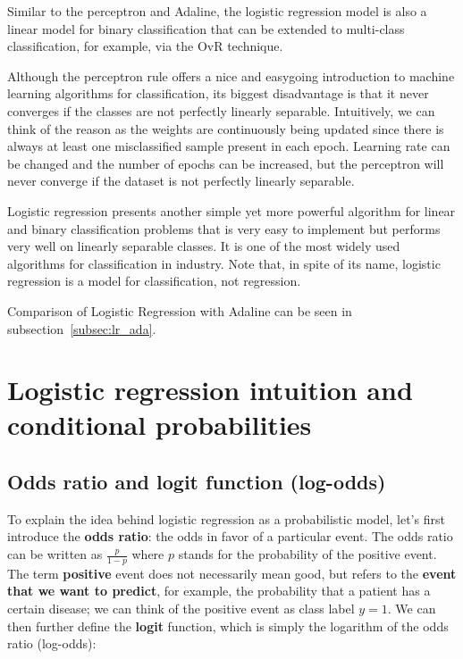 \documentclass[11pt]{article}
\begin{document}
    Similar to the perceptron\cite{Rosenblatt1957a} and Adaline\cite{Widrow1960}, the logistic regression model is also a linear model for binary classification that can be extended to multi-class classification, for example, via the OvR technique.

    Although the perceptron rule offers a nice and easygoing introduction to machine learning algorithms for classification, its biggest disadvantage is that it never converges if the classes are not perfectly linearly separable.
    Intuitively, we can think of the reason as the weights are continuously being updated since there is always at least one misclassified sample present in each epoch.
    Learning rate can be changed and the number of epochs can be increased, but the perceptron will never converge if the dataset is not perfectly linearly separable.

    Logistic regression presents another simple yet more powerful algorithm for linear and binary classification problems that is very easy to implement but performs very well on linearly separable classes.
    It is one of the most widely used algorithms for classification in industry.
    Note that, in spite of its name, logistic regression is a model for classification, not regression.

    Comparison of Logistic Regression with Adaline can be seen in subsection~\ref{subsec:lr_ada}.

    \section{Logistic regression intuition and conditional probabilities} \label{sec:lr_intu}

    \subsection{Odds ratio and logit function (log-odds)} \label{subsec:lr_log_odds}

    To explain the idea behind logistic regression as a probabilistic model, let's first introduce the \textbf{odds ratio}: the odds in favor of a particular event.
    The odds ratio can be written as $\frac{p} {1-p}$ where $p$ stands for the probability of the positive event.
    The term \textbf{positive} event does not necessarily mean good, but refers to the \textbf{event that we want to predict}, for example, the probability that a patient has a certain disease;
    we can think of the positive event as class label $y=1$.
    We can then further define the \textbf{logit} function, which is simply the logarithm of the odds ratio (log-odds):
\end{document}
